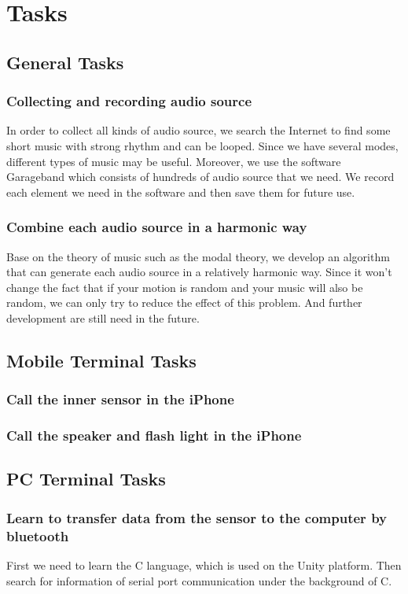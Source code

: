 \section{Tasks}
\subsection{General Tasks}
\subsubsection{Collecting and recording audio source}
In order to collect all kinds of audio source, we search the Internet to find some short music with strong rhythm and can be looped. Since we have several modes, different types of music may be useful. Moreover, we use the software Garageband which consists of hundreds of audio source that we need. We record each element we need in the software and then save them for future use.
\subsubsection{Combine each audio source in a harmonic way}
Base on the theory of music such as the modal theory, we develop an algorithm that can generate each audio source in a relatively harmonic way. Since it won’t change the fact that if your motion is random and your music will also be random, we can only try to reduce the effect of this problem. And further development are still need in the future. 
\subsection{Mobile Terminal Tasks}
\subsubsection{Call the inner sensor in the iPhone}
\subsubsection{Call the speaker and flash light in the iPhone}
\subsection{PC Terminal Tasks}
	\subsubsection{Learn to transfer data from the sensor to the computer by bluetooth}
	First we need to learn the C language, which is used on the Unity platform. Then search for information of serial port communication under the background of C. 
